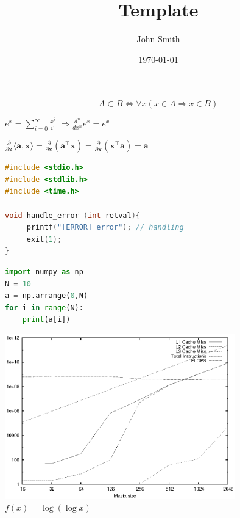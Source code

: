 \documentclass[a4j]{jarticle}
\title{Template}
\author{John Smith}
\date{\today}
\let \ds \displaystyle
\newcommand{\idiff}[3]{
  \frac{d^{#1} #2}{d #3^{#1}}
}
\newcommand{\pdiff}[3]{
  \frac{\partial^{#1} #2}{\partial #3^{#1}}
}
\begin{document}
\thispagestyle{empty}
\maketitle
\pagebreak


$$ A \subset B \Leftrightarrow \forall x ( x \in A \Rightarrow x \in B) $$

$\displaystyle  e^x = \sum_{i=0}^\infty \frac{x^i}{i!}$  $ \Rightarrow \idiff{n}{}{x} e^x = e^x$

$\ds \pdiff{}{}{\bm{x}}\langle \bm{a},\bm{x} \rangle =\frac{\partial}{\partial \bm{x}} \left( \bm{a}^\top \bm{x}\right)= \frac{\partial}{\partial \bm{x}} \left( \bm{x}^\top \bm{a}\right) = \bm{a}$

\begin{lstlisting}[language=C]
#include <stdio.h>
#include <stdlib.h>
#include <time.h>

void handle_error (int retval){
     printf("[ERROR] error"); // handling
     exit(1);
}
\end{lstlisting}
\begin{lstlisting}[language=Python]
import numpy as np
N = 10
a = np.arrange(0,N)
for i in range(N):
    print(a[i])
\end{lstlisting}
\includegraphics[width=10cm]{template.eps}
\pagebreak
\newpage
$ f(x) = \log(\log x) $
\end{document}
